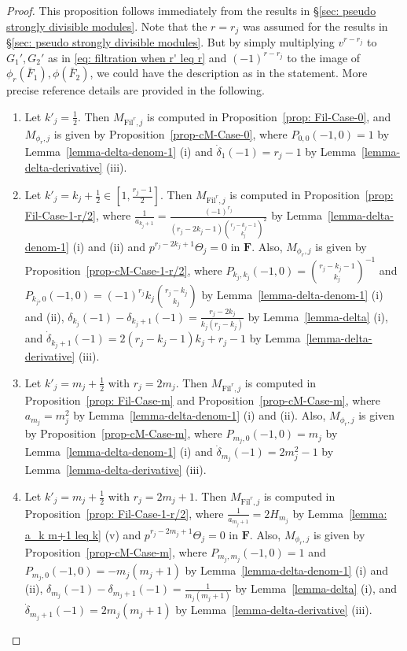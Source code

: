 \documentclass[11pt]{amsart}
\theoremstyle{definition}
\numberwithin{equation}{subsection}
\theoremstyle{plain}
\theoremstyle{plain}
\theoremstyle{plain}
\theoremstyle{plain}
\theoremstyle{plain}
\theoremstyle{plain}
\theoremstyle{plain}
\theoremstyle{plain}
\theoremstyle{plain}
\theoremstyle{plain}
\theoremstyle{plain}
\theoremstyle{plain}
\theoremstyle{definition}
\theoremstyle{definition}
\theoremstyle{definition}
\theoremstyle{remark}
\renewcommand{\(}{\textup{(}}
\renewcommand{\)}{\textup{)}}
\newcommand{\F}{\mathbf{F}}
\newcommand{\Fil}{\mathrm{Fil}}
\begin{document}
\begin{proof}
This proposition follows immediately from the results in \S\ref{sec: pseudo strongly divisible modules}. Note that the $r=r_j$ was assumed for the results in \S\ref{sec: pseudo strongly divisible modules}. But by simply multiplying $v^{r-r_j}$ to $G_1',G_2'$ as in \eqref{eq: filtration when r' leq r} and $(-1)^{r-r_j}$ to the image of $\phi_r(\bar{F}_1),\phi(\bar{F}_2)$, we could have the description as in the statement. More precise reference details are provided in the following.
\begin{enumerate}[leftmargin=*]
\item Let $k'_j=\frac{1}{2}$. Then $M_{\Fil^r,j}$ is computed in Proposition~\ref{prop: Fil-Case-0}, and $M_{\phi_r,j}$ is given by Proposition~\ref{prop-cM-Case-0}, where $P_{0,0}(-1,0)=1$ by Lemma~\ref{lemma-delta-denom-1} (i) and $\dot\delta_1(-1)=r_j-1$ by Lemma~\ref{lemma-delta-derivative} (iii).
\item Let $k'_j=k_j+\frac{1}{2}\in[1,\frac{r_j-1}{2}]$. Then $M_{\Fil^r,j}$ is computed in Proposition~\ref{prop: Fil-Case-1-r/2}, where $\frac{1}{a_{k_j+1}}=\frac{(-1)^{r_j}}{(r_j-2k_j-1)\binom{r_j-k_j-1}{k_j}^2}$ by Lemma~\ref{lemma-delta-denom-1} (i) and (ii) and $p^{r_j-2k_j+1}\Theta_j=0$ in $\F$. Also, $M_{\phi_r,j}$ is given by Proposition~\ref{prop-cM-Case-1-r/2}, where $P_{k_j,k_j}(-1,0)=\binom{r_j-k_j-1}{k_j}^{-1}$ and $P_{k_j,0}(-1,0)=(-1)^{r_j}k_j\binom{r_j-k_j}{k_j}$ by Lemma~\ref{lemma-delta-denom-1} (i) and (ii), $\delta_{k_j}(-1)-\delta_{k_j+1}(-1)=\frac{r_j-2k_j}{k_j(r_j-k_j)}$ by Lemma~\ref{lemma-delta} (i), and $\dot\delta_{k_j+1}(-1)=2(r_j-k_j-1)k_j+r_j-1$ by Lemma~\ref{lemma-delta-derivative} (iii).
\item Let $k'_j=m_j+\frac{1}{2}$ with $r_j=2m_j$. Then $M_{\Fil^r,j}$ is computed in Proposition~\ref{prop: Fil-Case-m} and Proposition~\ref{prop-cM-Case-m}, where $a_{m_j}=m_j^2$ by Lemma~\ref{lemma-delta-denom-1} (i) and (ii). Also, $M_{\phi_r,j}$ is given by Proposition~\ref{prop-cM-Case-m}, where $P_{m_j,0}(-1,0)=m_j$ by Lemma~\ref{lemma-delta-denom-1} (i) and $\dot\delta_{m_j}(-1)=2m_j^2-1$ by Lemma~\ref{lemma-delta-derivative} (iii).
\item Let $k'_j=m_j+\frac{1}{2}$ with $r_j=2m_j+1$. Then $M_{\Fil^r,j}$ is computed in Proposition~\ref{prop: Fil-Case-1-r/2}, where $\frac{1}{a_{m_j+1}}=2H_{m_j}$ by Lemma~\ref{lemma: a_k m+1 leq k} (v) and $p^{r_j-2m_j+1}\Theta_j=0$ in $\F$. Also, $M_{\phi_r,j}$ is given by Proposition~\ref{prop-cM-Case-m}, where $P_{m_j,m_j}(-1,0)=1$ and $P_{m_j,0}(-1,0)=-m_j(m_j+1)$ by Lemma~\ref{lemma-delta-denom-1} (i) and (ii), $\delta_{m_j}(-1)-\delta_{m_j+1}(-1)=\frac{1}{m_j(m_j+1)}$ by Lemma~\ref{lemma-delta} (i), and $\dot\delta_{m_j+1}(-1)=2m_j(m_j+1)$ by Lemma~\ref{lemma-delta-derivative} (iii).

\end{enumerate}
\end{proof}
\end{document}
